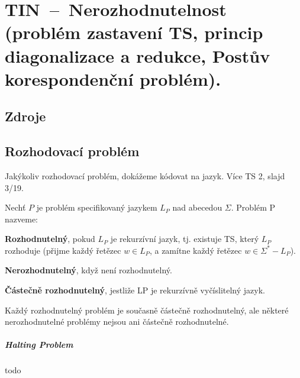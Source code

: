 

\graphicspath{{tin/nerozhodnutelnost/figures}}


\chapter{TIN~--~Nerozhodnutelnost (problém zastavení TS, princip diagonalizace a redukce, Postův korespondenční problém).}


\section{Zdroje}

\begin{compactitem}
    \item {}
    \item {}
\end{compactitem}


\section{Rozhodovací problém}

Jakýkoliv rozhodovací problém, dokážeme kódovat na jazyk. Více TS 2, slajd 3/19. 

Nechť $P$ je problém specifikovaný jazykem $L_P$ nad abecedou $\Sigma$. Problém P nazveme: \begin{compactitem}

    \item \textbf{Rozhodnutelný}, pokud $L_P$ je rekurzívní jazyk, tj. existuje TS, který $L_P$ rozhoduje (přijme každý řetězec $w \in L_P$, a zamítne každý řetězec $w \in \Sigma^* - L_P $).

    \item \textbf{Nerozhodnutelný}, když není rozhodnutelný.

    \item \textbf{Částečně rozhodnutelný}, jestliže LP je rekurzívně vyčíslitelný jazyk.

\end{compactitem}

Každý rozhodnutelný problém je současně částečně rozhodnutelný, ale některé nerozhodnutelné problémy nejsou ani částečně rozhodnutelné.

\paragraph*{Halting Problem} todo
